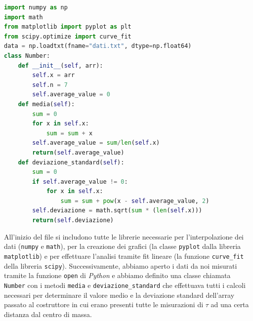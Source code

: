 \documentclass{article}
\begin{document}
\begin{minipage}{0.5\textwidth}
	\begin{lstlisting}[language=Python]
import numpy as np
import math
from matplotlib import pyplot as plt 
from scipy.optimize import curve_fit
data = np.loadtxt(fname="dati.txt", dtype=np.float64)
class Number:
    def __init__(self, arr):
        self.x = arr
        self.n = 7
        self.average_value = 0
    def media(self):
        sum = 0
        for x in self.x:
            sum = sum + x
        self.average_value = sum/len(self.x)
        return(self.average_value)
    def deviazione_standard(self):
        sum = 0
        if self.average_value != 0:
            for x in self.x:
                sum = sum + pow(x - self.average_value, 2)
        self.deviazione = math.sqrt(sum * (len(self.x)))
        return(self.deviazione)
\end{lstlisting}
\end{minipage}
\hspace{0.1\textwidth}
\begin{minipage}{0.4\textwidth}
\vspace{-1cm}
All'inizio del file si includono tutte le librerie necessarie per l'interpolazione dei dati (\texttt{numpy} e \texttt{math}), per la creazione dei grafici (la classe \texttt{pyplot} dalla libreria \texttt{matplotlib}) e per effettuare l'analisi tramite fit lineare (la funzione \texttt{curve\_fit} della libreria \texttt{scipy}). Successivamente, abbiamo aperto i dati da noi misurati tramite la funzione \texttt{open} di \emph{Python} e abbiamo definito una classe chiamata \texttt{Number} con i metodi \texttt{media} e \texttt{deviazione\_standard} che effettuava tutti i calcoli necessari per determinare il valore medio e la deviazione standard dell'array passato al costruttore in cui erano presenti tutte le misurazioni di $\tau$ ad una certa distanza dal centro di massa.
\end{minipage}
\end{document}

